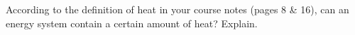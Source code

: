 \label{fnt1.1.3-5}

 According to the definition of heat in your course notes (pages 8 \& 16), can an energy system contain a certain amount of heat? Explain.